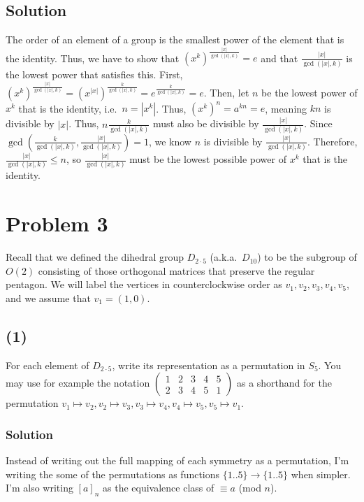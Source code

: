 \documentclass[fleqn]{article}
\begin{document}
        \subsection{Solution}
        The order of an element of a group is the smallest power of the element that is the identity.  Thus, we have to show that $(x^k)^{\frac{|x|}{\gcd(|x|, k)}} = e$ and that $\frac{|x|}{\gcd(|x|, k)}$ is the lowest power that satisfies this.  First, $(x^k)^{\frac{|x|}{\gcd(|x|, k)}} = (x^{|x|})^{\frac{k}{\gcd(|x|, k)}} = e^{\frac{k}{\gcd(|x|, k)}} = e$.  Then, let $n$ be the lowest power of $x^k$ that is the identity, i.e.\ $n = \left|x^k\right|$.  Thus, $(x^k)^n = a^{kn} = e$, meaning $kn$ is divisible by $|x|$.  Thus, $n \frac{k}{\gcd(|x|, k)}$ must also be divisible by $\frac{|x|}{\gcd(|x|, k)}$.  Since $\gcd(\frac{k}{\gcd(|x|, k)}, \frac{|x|}{\gcd(|x|, k)}) = 1$, we know $n$ is divisible by $\frac{|x|}{\gcd(|x|, k)}$.  Therefore, $\frac{|x|}{\gcd(|x|, k)} \leq n$, so $\frac{|x|}{\gcd(|x|, k)}$ must be the lowest possible power of $x^k$ that is the identity.
    
    \section{Problem 3}
    Recall that we defined the dihedral group $D_{2 \cdot 5}$ (a.k.a.\ $D_{10}$) to be the subgroup of $O(2)$ consisting of those orthogonal matrices that preserve the regular pentagon.  We will label the vertices in counterclockwise order as $v_1, v_2, v_3, v_4, v_5$, and we assume that $v_1 = (1, 0)$.
        
        \subsection{(1)}
        For each element of $D_{2 \cdot 5}$, write its representation as a permutation in $S_5$.  You may use for example the notation $\begin{pmatrix}
            1 & 2 & 3 & 4 & 5 \\
            2 & 3 & 4 & 5 & 1
        \end{pmatrix}$ as a shorthand for the permutation $v_1 \mapsto v_2, v_2 \mapsto v_3, v_3 \mapsto v_4, v_4 \mapsto v_5, v_5 \mapsto v_1$.
            
            \subsubsection{Solution}
            Instead of writing out the full mapping of each symmetry as a permutation, I'm writing the some of the permutations as functions $\{1..5\} \to \{1..5\}$ when simpler.  I'm also writing $[a]_n$ as the equivalence class of $\equiv a$ (mod $n$).
            
\end{document}
